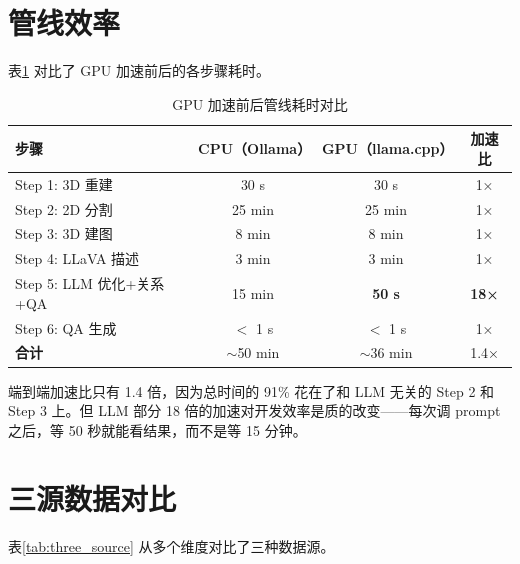 \section{管线效率}

表\ref{tab:pipeline_time} 对比了 GPU 加速前后的各步骤耗时。

\begin{table}[H]
\centering
\caption{GPU 加速前后管线耗时对比}
\label{tab:pipeline_time}
\begin{tabular}{lccc}
\toprule
\textbf{步骤} & \textbf{CPU（Ollama）} & \textbf{GPU（llama.cpp）} & \textbf{加速比} \\
\midrule
Step 1: 3D 重建 & 30 s & 30 s & 1× \\
Step 2: 2D 分割 & 25 min & 25 min & 1× \\
Step 3: 3D 建图 & 8 min & 8 min & 1× \\
Step 4: LLaVA 描述 & 3 min & 3 min & 1× \\
Step 5: LLM 优化+关系+QA & 15 min & \textbf{50 s} & \textbf{18×} \\
Step 6: QA 生成 & $<$ 1 s & $<$ 1 s & 1× \\
\midrule
\textbf{合计} & $\sim$50 min & $\sim$36 min & 1.4× \\
\bottomrule
\end{tabular}
\end{table}

端到端加速比只有 1.4 倍，因为总时间的 91\% 花在了和 LLM 无关的 Step 2 和 Step 3 上。但 LLM 部分 18 倍的加速对开发效率是质的改变——每次调 prompt 之后，等 50 秒就能看结果，而不是等 15 分钟。

\section{三源数据对比}

表\ref{tab:three_source} 从多个维度对比了三种数据源。

